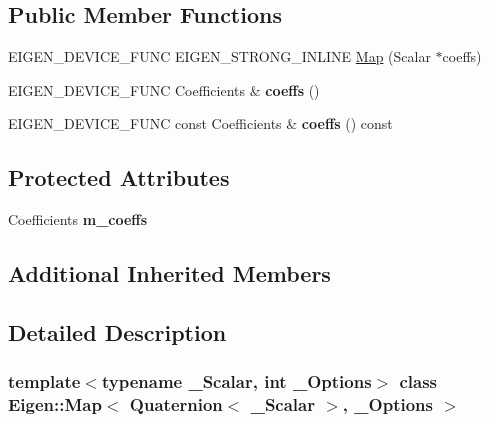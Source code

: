 \subsection*{Public Member Functions}
\begin{DoxyCompactItemize}
\item 
E\+I\+G\+E\+N\+\_\+\+D\+E\+V\+I\+C\+E\+\_\+\+F\+U\+NC E\+I\+G\+E\+N\+\_\+\+S\+T\+R\+O\+N\+G\+\_\+\+I\+N\+L\+I\+NE \mbox{\hyperlink{class_eigen_1_1_map_3_01_quaternion_3_01___scalar_01_4_00_01___options_01_4_ad94fc6daefd48cccb87aef782e0949e5}{Map}} (Scalar $\ast$coeffs)
\item 
\mbox{\label{class_eigen_1_1_map_3_01_quaternion_3_01___scalar_01_4_00_01___options_01_4_a4624f9727ae0e7d7ca37da307c308156}} 
E\+I\+G\+E\+N\+\_\+\+D\+E\+V\+I\+C\+E\+\_\+\+F\+U\+NC Coefficients \& {\bfseries coeffs} ()
\item 
\mbox{\label{class_eigen_1_1_map_3_01_quaternion_3_01___scalar_01_4_00_01___options_01_4_adf80ec28e7c4d5d02a01d545f4cbf94f}} 
E\+I\+G\+E\+N\+\_\+\+D\+E\+V\+I\+C\+E\+\_\+\+F\+U\+NC const Coefficients \& {\bfseries coeffs} () const
\end{DoxyCompactItemize}
\subsection*{Protected Attributes}
\begin{DoxyCompactItemize}
\item 
\mbox{\label{class_eigen_1_1_map_3_01_quaternion_3_01___scalar_01_4_00_01___options_01_4_af5ff3aeaf87d6a7cdba4de851a427736}} 
Coefficients {\bfseries m\+\_\+coeffs}
\end{DoxyCompactItemize}
\subsection*{Additional Inherited Members}


\subsection{Detailed Description}
\subsubsection*{template$<$typename \+\_\+\+Scalar, int \+\_\+\+Options$>$\newline
class Eigen\+::\+Map$<$ Quaternion$<$ \+\_\+\+Scalar $>$, \+\_\+\+Options $>$}

